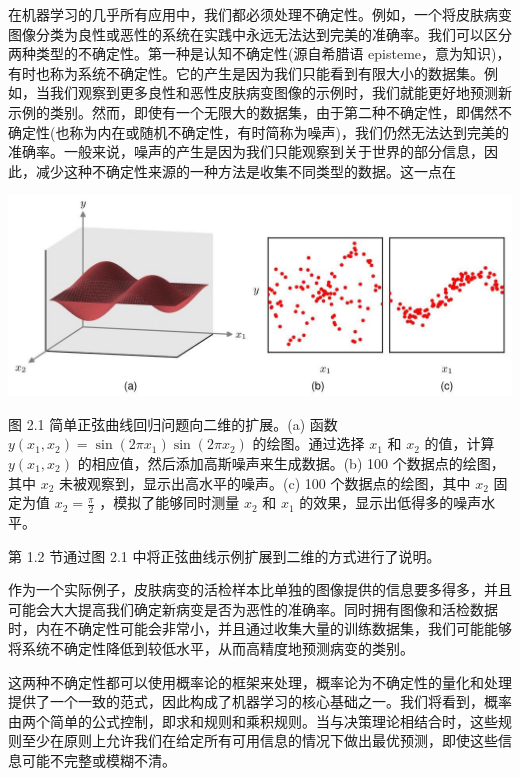 \documentclass[10pt]{article}
\begin{document}
在机器学习的几乎所有应用中，我们都必须处理不确定性。例如，一个将皮肤病变图像分类为良性或恶性的系统在实践中永远无法达到完美的准确率。我们可以区分两种类型的不确定性。第一种是认知不确定性(源自希腊语 episteme，意为知识)，有时也称为系统不确定性。它的产生是因为我们只能看到有限大小的数据集。例如，当我们观察到更多良性和恶性皮肤病变图像的示例时，我们就能更好地预测新示例的类别。然而，即使有一个无限大的数据集，由于第二种不确定性，即偶然不确定性(也称为内在或随机不确定性，有时简称为噪声)，我们仍然无法达到完美的准确率。一般来说，噪声的产生是因为我们只能观察到关于世界的部分信息，因此，减少这种不确定性来源的一种方法是收集不同类型的数据。这一点在

\begin{center}
\includegraphics[max width=1.0\textwidth]{images/0194e279-9b28-703a-88f4-c3ac21e2010d_43_240_345_1276_509_0.jpg}
\end{center}
\hspace*{3em} 

图 2.1 简单正弦曲线回归问题向二维的扩展。(a) 函数 \(y\left( {{x}_{1},{x}_{2}}\right)  = \sin \left( {{2\pi }{x}_{1}}\right) \sin \left( {{2\pi }{x}_{2}}\right)\) 的绘图。通过选择 \({x}_{1}\) 和 \({x}_{2}\) 的值，计算 \(y\left( {{x}_{1},{x}_{2}}\right)\) 的相应值，然后添加高斯噪声来生成数据。(b) 100 个数据点的绘图，其中 \({x}_{2}\) 未被观察到，显示出高水平的噪声。(c) 100 个数据点的绘图，其中 \({x}_{2}\) 固定为值 \({x}_{2} = \frac{\pi }{2}\) ，模拟了能够同时测量 \({x}_{2}\) 和 \({x}_{1}\) 的效果，显示出低得多的噪声水平。

第 1.2 节通过图 2.1 中将正弦曲线示例扩展到二维的方式进行了说明。

作为一个实际例子，皮肤病变的活检样本比单独的图像提供的信息要多得多，并且可能会大大提高我们确定新病变是否为恶性的准确率。同时拥有图像和活检数据时，内在不确定性可能会非常小，并且通过收集大量的训练数据集，我们可能能够将系统不确定性降低到较低水平，从而高精度地预测病变的类别。

这两种不确定性都可以使用概率论的框架来处理，概率论为不确定性的量化和处理提供了一个一致的范式，因此构成了机器学习的核心基础之一。我们将看到，概率由两个简单的公式控制，即求和规则和乘积规则。当与决策理论相结合时，这些规则至少在原则上允许我们在给定所有可用信息的情况下做出最优预测，即使这些信息可能不完整或模糊不清。
\end{document}
